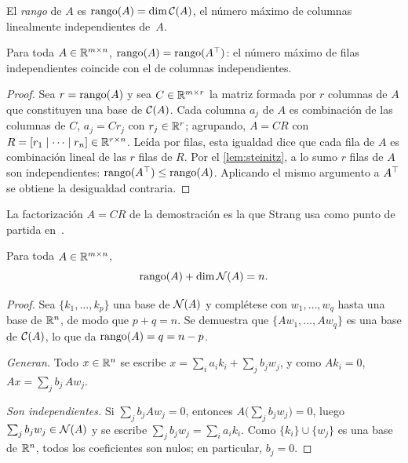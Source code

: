 \begin{definicion}[Rango]
El \emph{rango} de $A$ es $\operatorname{rango}(A)=\dim\mathcal{C}(A)$, el número máximo de columnas linealmente independientes de~$A$.
\end{definicion}

\begin{teorema}\label{teo:filas-columnas}
Para toda $A\in\mathbb{R}^{m\times n}$, $\operatorname{rango}(A)=\operatorname{rango}(A^{\top})$: el número máximo de filas independientes coincide con el de columnas independientes.
\end{teorema}

\begin{proof}
Sea $r=\operatorname{rango}(A)$ y sea $C\in\mathbb{R}^{m\times r}$ la matriz formada por $r$ columnas de $A$ que constituyen una base de $\mathcal{C}(A)$. Cada columna $a_j$ de $A$ es combinación de las columnas de $C$, $a_j=Cr_j$ con $r_j\in\mathbb{R}^{r}$; agrupando, $A=CR$ con $R=[r_1\mid\cdots\mid r_n]\in\mathbb{R}^{r\times n}$. Leída por filas, esta igualdad dice que cada fila de $A$ es combinación lineal de las $r$ filas de $R$. Por el \cref{lem:steinitz}, a lo sumo $r$ filas de $A$ son independientes: $\operatorname{rango}(A^{\top})\le\operatorname{rango}(A)$. Aplicando el mismo argumento a $A^{\top}$ se obtiene la desigualdad contraria.
\end{proof}

La factorización $A=CR$ de la demostración es la que Strang usa como punto de partida en~\cite[§1.4]{strang-ila}.

\begin{teorema}\label{teo:rango-nulidad}
Para toda $A\in\mathbb{R}^{m\times n}$,
\[
\operatorname{rango}(A)+\dim\mathcal{N}(A)=n.
\]
\end{teorema}

\begin{proof}
Sea $\{k_1,\dots,k_p\}$ una base de $\mathcal{N}(A)$ y complétese con $w_1,\dots,w_q$ hasta una base de $\mathbb{R}^{n}$, de modo que $p+q=n$. Se demuestra que $\{Aw_1,\dots,Aw_q\}$ es una base de $\mathcal{C}(A)$, lo que da $\operatorname{rango}(A)=q=n-p$.

\emph{Generan.} Todo $x\in\mathbb{R}^{n}$ se escribe $x=\sum_i a_ik_i+\sum_j b_jw_j$, y como $Ak_i=0$, $Ax=\sum_j b_j\,Aw_j$.

\emph{Son independientes.} Si $\sum_j b_jAw_j=0$, entonces $A\bigl(\sum_j b_jw_j\bigr)=0$, luego $\sum_j b_jw_j\in\mathcal{N}(A)$ y se escribe $\sum_j b_jw_j=\sum_i a_ik_i$. Como $\{k_i\}\cup\{w_j\}$ es una base de $\mathbb{R}^{n}$, todos los coeficientes son nulos; en particular, $b_j=0$.
\end{proof}

